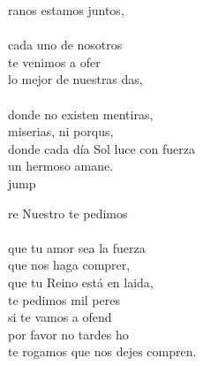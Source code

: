 \begin{cancion}%
	ranos estamos juntos,\\
	\jump\\
cada uno de nosotros \\
	te venimos a ofer\\
	lo mejor de nuestras das,\\
	\jump\\
donde no existen mentiras, \\
	miserias, ni porqus,\\
	donde cada día Sol luce con fuerza\\
	un hermoso amane.\\jump\\
	\begin{chorus}%
	re Nuestro te pedimos\\
	\jump\\
que tu amor sea la fuerza\\
	que nos haga comprer,\\
	que tu Reino está en laida,\\
	te pedimos mil peres\\
	si te vamos a ofend\\
	por favor no tardes ho \\
	te rogamos que nos dejes compren.\\
	\end{chorus}%
	\jump\\
\end{cancion}%
